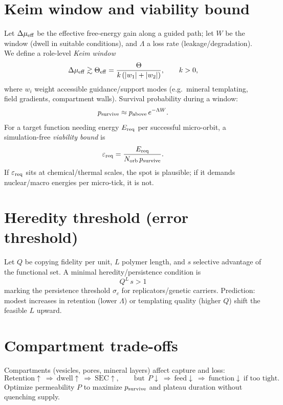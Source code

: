 \documentclass[12pt,a4paper,oneside]{scrreprt}
\begin{document}
\section{Keim window and viability bound}\label{sec:life-keim}
Let $\Delta\mu_{\rm eff}$ be the effective free-energy gain along a guided path; let $W$ be the window (dwell in suitable conditions), and $\Lambda$ a loss rate (leakage/degradation).
We define a role-level \emph{Keim window}
\begin{equation}
\Delta\mu_{\rm eff} \gtrsim \Theta_{\rm eff}
=\frac{\Theta}{k\,(|w_1|+|w_2|)},
\qquad k>0,
\end{equation}
where $w_i$ weight accessible guidance/support modes (e.g.\ mineral templating, field gradients, compartment walls). 
Survival probability during a window:
\begin{equation}
p_{\rm survive}\approx p_{\rm above}\,e^{-\Lambda W}.
\end{equation}
For a target function needing energy $E_{\rm req}$ per successful micro-orbit, a simulation-free \emph{viability bound} is
\begin{equation}
\varepsilon_{\rm req}=\frac{E_{\rm req}}{N_{\rm orb}\,p_{\rm survive}}.
\end{equation}
If $\varepsilon_{\rm req}$ sits at chemical/thermal scales, the spot is plausible; if it demands nuclear/macro energies per micro-tick, it is not.

\section{Heredity threshold (error threshold)}\label{sec:life-heredity}
Let $Q$ be copying fidelity per unit, $L$ polymer length, and $s$ selective advantage of the functional set. 
A minimal heredity/persistence condition is
\begin{equation}
\boxed{~Q^{L}\,s>1~}
\end{equation}
marking the persistence threshold $\sigma_c$ for replicators/genetic carriers. 
Prediction: modest increases in retention (lower $\Lambda$) or templating quality (higher $Q$) shift the feasible $L$ upward.

\section{Compartment trade-offs}\label{sec:life-compartments}
Compartments (vesicles, pores, mineral layers) affect capture and loss:
\[
\text{Retention}\uparrow\ \Rightarrow\ \text{dwell}\uparrow\ \Rightarrow\ \text{SEC}\uparrow,
\qquad 
\text{but}\ \ P\downarrow\ \Rightarrow\ \text{feed}\downarrow\ \Rightarrow\ \text{function}\downarrow \ \text{if too tight}.
\]
Optimize permeability $P$ to maximize $p_{\rm survive}$ and plateau duration without quenching supply.
\end{document}

